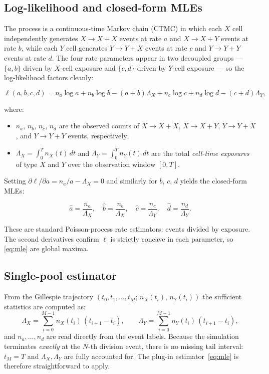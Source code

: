 \documentclass[12pt]{article}
\begin{document}
\subsection{Log-likelihood and closed-form MLEs}

The process is a continuous-time Markov chain (CTMC) in which each $X$ cell
independently generates $X\!\to\!X{+}X$ events at rate $a$ and
$X\!\to\!X{+}Y$ events at rate $b$, while each $Y$ cell generates
$Y\!\to\!Y{+}X$ events at rate $c$ and $Y\!\to\!Y{+}Y$ events at rate $d$.
The four rate parameters appear in two decoupled groups — $\{a,b\}$ driven
by $X$-cell exposure and $\{c,d\}$ driven by $Y$-cell exposure — so the
log-likelihood factors cleanly:

\begin{equation}
  \ell(a,b,c,d)
  = n_a\log a + n_b\log b - (a+b)\Lambda_X
  + n_c\log c + n_d\log d - (c+d)\Lambda_Y,
  \label{eq:loglik}
\end{equation}

where:
\begin{itemize}
  \item $n_a$, $n_b$, $n_c$, $n_d$ are the observed counts of
        $X\!\to\!X{+}X$, $X\!\to\!X{+}Y$, $Y\!\to\!Y{+}X$, and
        $Y\!\to\!Y{+}Y$ events, respectively;
  \item $\Lambda_X = \int_0^T n_X(t)\,dt$ and
        $\Lambda_Y = \int_0^T n_Y(t)\,dt$ are the total \emph{cell-time
        exposures} of type $X$ and $Y$ over the observation window $[0,T]$.
\end{itemize}

Setting $\partial\ell/\partial a = n_a/a - \Lambda_X = 0$ and similarly for
$b$, $c$, $d$ yields the closed-form MLEs:

\begin{equation}
  \hat{a} = \frac{n_a}{\Lambda_X},\quad
  \hat{b} = \frac{n_b}{\Lambda_X},\quad
  \hat{c} = \frac{n_c}{\Lambda_Y},\quad
  \hat{d} = \frac{n_d}{\Lambda_Y}.
  \label{eq:mle}
\end{equation}

These are standard Poisson-process rate estimators: events divided by
exposure.  The second derivatives confirm $\ell$ is strictly concave in each
parameter, so \eqref{eq:mle} are global maxima.

\subsection{Single-pool estimator}

From the Gillespie trajectory $(t_0, t_1, \ldots, t_M;\, n_X(t_i),\, n_Y(t_i))$
the sufficient statistics are computed as:
\[
  \Lambda_X = \sum_{i=0}^{M-1} n_X(t_i)\,(t_{i+1}-t_i),
  \qquad
  \Lambda_Y = \sum_{i=0}^{M-1} n_Y(t_i)\,(t_{i+1}-t_i),
\]
and $n_a,\ldots,n_d$ are read directly from the event labels.
Because the simulation terminates \emph{exactly} at the $N$-th division
event, there is no missing tail interval: $t_M = T$ and $\Lambda_X,
\Lambda_Y$ are fully accounted for.  The plug-in estimator~\eqref{eq:mle}
is therefore straightforward to apply.
\end{document}
